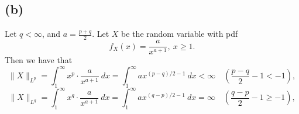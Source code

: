 \subsection*{(b)}
Let $q < \infty$, and $a = \frac{p + q}{2}$. Let $X$ be the random variable with pdf 
\[ f_X(x) = \frac{a}{x^{a + 1}}, \ x \geq 1. \]
Then we have that 
\[ \|X\|_{L^p} = \int_{1}^{\infty} x^p \cdot \frac{a}{x^{a + 1}} \ dx 
= \int_{1}^{\infty} ax^{(p - q) / 2 - 1} \ dx < \infty \quad (\frac{p - q}{2} - 1 < -1), \]
\[ \|X\|_{L^q} = \int_{1}^{\infty} x^q \cdot \frac{a}{x^{a + 1}} \ dx 
= \int_{1}^{\infty} ax^{(q - p) / 2 - 1} \ dx = \infty \quad (\frac{q - p}{2} - 1 \geq -1), \]

